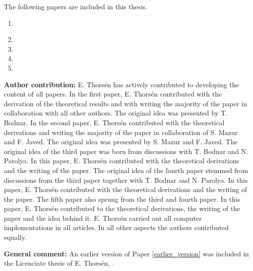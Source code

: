 The following papers are included in this thesis.
\begin{enumerate}[P{A}PER I: ]
  \setlength{\itemsep}{3.3mm} %
  \item {} \label{earlier_version}
  \item {}
  \item {}
  \item {}
  \item {}
\end{enumerate}
\textbf{Author contribution:} 
E. Thors\'en has actively contributed to developing the content of all papers.
In the first paper, E. Thors\'en contributed with the derivation of the theoretical results and with writing the majority of the paper in collaboration with all other authors. The original idea was presented by T. Bodnar.
In the second paper, E. Thors\'en contributed with the theoretical derivations and writing the majority of the paper in collaboration of S. Mazur and F. Javed. The original idea was presented by S. Mazur and F. Javed.
The original idea of the third paper was born from discussions with T. Bodnar and N. Parolya. 
In this paper, E. Thors\'en contributed with the theoretical derivations and the writing of the paper.
The original idea of the fourth paper stemmed from discussions from the third paper together with T. Bodnar and N. Parolya.
In this paper, E. Thors\'en contributed with the theoretical derivations and the writing of the paper.
The fifth paper also sprung from the third and fourth paper. 
In this paper, E. Thors\'en contributed to the theoretical derivations, the writing of the paper and the idea behind it.
E. Thorsén carried out all computer implementations in all articles.
In all other aspects the authors contributed equally.

\textbf{General comment:} An earlier version of Paper \ref{earlier_version} was included in the Licenciate thesis of E. Thors\'en, \citet{thorsen2019assessment}.

\nocite{bodnar2021quantile_thesis, BODNAR2022127120, bodnar2021bayesian_thesis, DOSPortfolio_thesis}
\printbibliography[keyword={papers_list}, heading=subsubbibliography]
